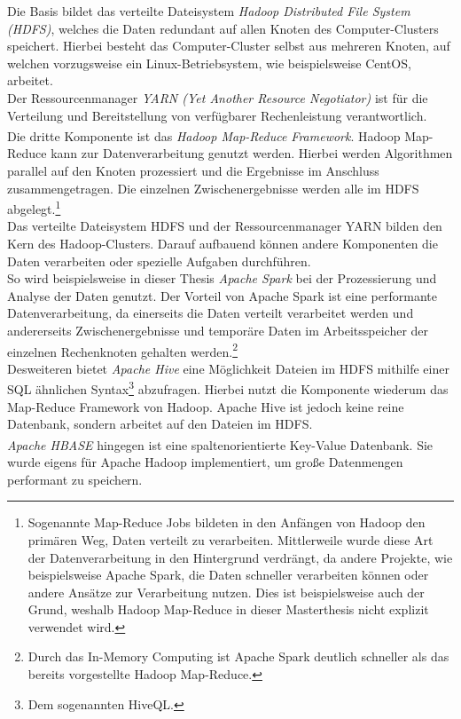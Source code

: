 \noindent
Die Basis bildet das verteilte Dateisystem \textit{Hadoop Distributed File System (HDFS)}, welches die Daten redundant auf allen Knoten des Computer-Clusters speichert. Hierbei besteht das Computer-Cluster selbst aus mehreren Knoten, auf welchen vorzugsweise ein Linux-Betriebsystem, wie beispielsweise CentOS, arbeitet.\\
Der Ressourcenmanager \textit{YARN (Yet Another Resource Negotiator)} ist für die Verteilung und Bereitstellung von verfügbarer Rechenleistung verantwortlich.\\ 
Die dritte Komponente ist das \textit{Hadoop\textsuperscript{\textregistered} Map-Reduce Framework}. Hadoop Map-Reduce kann zur Datenverarbeitung genutzt werden. Hierbei werden Algorithmen parallel auf den Knoten prozessiert und die Ergebnisse im Anschluss zusammengetragen. Die einzelnen Zwischenergebnisse werden alle im HDFS abgelegt.\footnote{Sogenannte Map-Reduce Jobs bildeten in den Anfängen von Hadoop den primären Weg, Daten verteilt zu verarbeiten. Mittlerweile wurde diese Art der Datenverarbeitung in den Hintergrund verdrängt, da andere Projekte, wie beispielsweise Apache Spark, die Daten schneller verarbeiten können oder andere Ansätze zur Verarbeitung nutzen. Dies ist beispielsweise auch der Grund, weshalb Hadoop Map-Reduce in dieser Masterthesis nicht explizit verwendet wird.} \\

\noindent
Das verteilte Dateisystem HDFS und der Ressourcenmanager YARN bilden den Kern des Hadoop-Clusters. Darauf aufbauend können andere Komponenten die Daten verarbeiten oder spezielle Aufgaben durchführen.\\
So wird beispielsweise in dieser Thesis \textit{Apache Spark\texttrademark\thinspace} bei der Prozessierung und Analyse der Daten genutzt. Der Vorteil von Apache Spark ist eine performante Datenverarbeitung, da einerseits die Daten verteilt verarbeitet werden und andererseits Zwischenergebnisse und temporäre Daten im Arbeitsspeicher der einzelnen Rechenknoten gehalten werden.\footnote{Durch das In-Memory Computing ist Apache Spark deutlich schneller als das bereits vorgestellte Hadoop Map-Reduce.}\\
Desweiteren bietet \textit{Apache Hive\texttrademark\thinspace} eine Möglichkeit Dateien im HDFS mithilfe einer SQL ähnlichen Syntax\footnote{Dem sogenannten HiveQL.} abzufragen. Hierbei nutzt die Komponente wiederum das Map-Reduce Framework von Hadoop. Apache Hive ist jedoch keine reine Datenbank, sondern arbeitet auf den Dateien im HDFS.\\
\textit{Apache HBASE\textsuperscript{\textregistered}} hingegen ist eine spaltenorientierte Key-Value Datenbank. Sie wurde eigens für Apache Hadoop implementiert, 
um große Datenmengen performant zu speichern.\\

